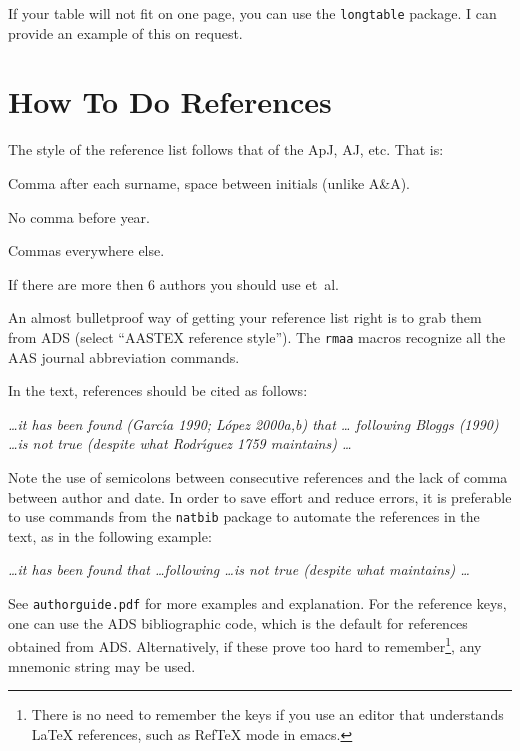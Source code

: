 \documentclass[debug]{rmaa}
\newenvironment{Example}
{\begin{list}{}{\setlength{\leftmargin}{10pt}\setlength{\rightmargin}{10pt}}%
  \item[]\itshape}
  {\end{list}}
\begin{document}
If your table will not fit on one page, you can use the \texttt{longtable}
package. I can provide an example of this on request. 

\section{How To Do References}
\label{sec:refs}

The style of the reference list follows that of the ApJ, AJ, etc. That
is:
\begin{compactitem}
\item Comma after each surname, space between initials (unlike A\&A).
\item No comma before year.
\item Commas everywhere else. 
\item If there are more then 6 authors you should use et~al.
\end{compactitem}
An almost bulletproof way of getting your reference list right is to
grab them from ADS (select ``AASTEX reference style''). The
\texttt{rmaa} macros recognize all the AAS journal abbreviation
commands. 

In the text, references should be cited as follows: 
\begin{Example}
  \dots it has been found (Garc\'\i{}a 1990; L\'opez 2000a,b) that \dots
  following Bloggs (1990) \dots is not true (despite what
  Rodr\'\i{}guez 1759 maintains) \dots
\end{Example}
Note the use of semicolons between consecutive references and the lack
of comma between author and date. In order to save effort and reduce
errors, it is preferable to use commands from the \texttt{natbib}
package to automate the references in the text, as in the following
example:
\begin{Example}
  \dots it has been found \citep{2005astro.ph.11035A,
    1991ApJ...374..580B, 2005MNRAS.358..291D} that \dots following
  \citet{1996ApJ...469..171G} \dots is not true (despite what
  \citealp{1939ApJ....89..526S} maintains) \dots
\end{Example}
See \texttt{authorguide.pdf} for more examples and explanation.  For
the reference keys, one can use the ADS bibliographic code, which is
the default for references obtained from ADS. Alternatively, if these
prove too hard to remember\footnote{There is no need to remember the
  keys if you use an editor that understands \LaTeX{} references, such
  as RefTeX mode in emacs.}, any mnemonic string may be used.
\end{document}
